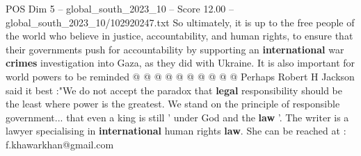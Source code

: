 \begin{textsample}{POS Dim 5 – global\_south\_2023\_10 – Score 12.00 – global\_south\_2023\_10/102920247.txt}
So ultimately, it is up to the free people of the world who believe in justice, accountability, and human rights, to ensure that their governments push for accountability by supporting an \textbf{international} war \textbf{crimes} investigation into Gaza, as they did with Ukraine.
It is also important for world powers to be reminded @ @ @ @ @ @ @ @ @ @ Perhaps Robert H Jackson said it best :"We do not accept the paradox that \textbf{legal} responsibility should be the least where power is the greatest.
We stand on the principle of responsible government... that even a king is still ' under God and the \textbf{law} '.
The writer is a lawyer specialising in \textbf{international} human rights \textbf{law}.
She can be reached at : f.khawarkhan@gmail.com

\end{textsample}

